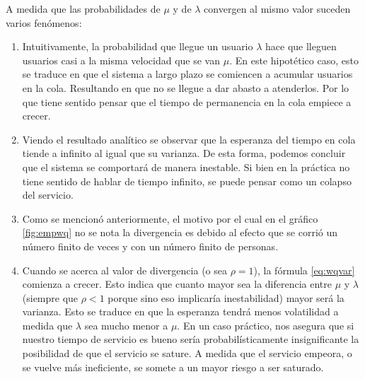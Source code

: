 \documentclass{sig-alternate}
\begin{document}
A medida que las probabilidades de $\mu$ y de $\lambda$ convergen al mismo valor suceden varios fenómenos: 
\begin{enumerate}
\item Intuitivamente, la probabilidad que llegue un usuario $\lambda$ hace que lleguen usuarios casi a la misma velocidad que se van $\mu$. En este hipotético caso, esto se traduce en que el sistema a largo plazo se comiencen a acumular usuarios en la cola. Resultando en que no se llegue a dar abasto a atenderlos. Por lo que tiene sentido pensar que el tiempo de permanencia en la cola empiece a crecer.
\item Viendo el resultado analítico se observar que la esperanza del tiempo en cola tiende a infinito al igual que su varianza. De esta forma, podemos concluir que el sistema se comportará de manera inestable. Si bien en la práctica no tiene sentido de hablar de tiempo infinito, se puede pensar como un colapso del servicio.
\item Como se mencionó anteriormente, el motivo por el cual en el gráfico \ref{fig:empwq} no se nota la divergencia es debido al efecto que se corrió un número finito de veces y con un número finito de personas. 
\item Cuando se acerca al valor de divergencia (o sea $\rho=1$), la fórmula \ref{eq:wqvar}  comienza a crecer. Esto indica que cuanto mayor sea la diferencia entre $\mu$ y $\lambda$ (siempre que $\rho < 1$ porque sino eso implicaría inestabilidad) mayor será la varianza. Esto se traduce en que la esperanza tendrá menos volatilidad a medida que $\lambda$ sea mucho menor a $\mu$. En un caso práctico, nos asegura que si nuestro tiempo de servicio es bueno sería probabilísticamente insignificante la posibilidad de que el servicio se sature. A medida que el servicio empeora, o se vuelve más ineficiente, se somete a un mayor riesgo a ser saturado.


\end{enumerate}
\end{document}
